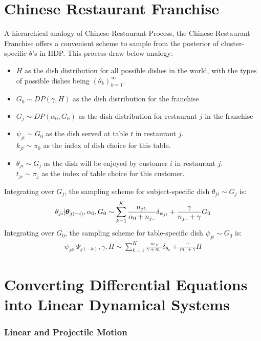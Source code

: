 \documentclass{article} %
\begin{document}
\section{Chinese Restaurant Franchise}\label{sec:CRF}
A hierarchical analogy of Chinese Restaurant Process, the Chinese Restaurant Franchise offers a convenient scheme to sample from the posterior of cluster-specific $\theta$'s in HDP. This process draw below analogy:
\begin{itemize}
\item $H$ as the dish distribution for all possible dishes in the world, with the types of possible dishes being $(\theta_k)_{k=1}^\infty$.
\item  $G_0 \sim DP(\gamma, H)$ as the dish distribution for the franchise
\item $G_j \sim DP(\alpha_0, G_0)$ as the dish distribution for restaurant $j$ in the franchise
\item $\psi_{jt} \sim G_0$ as the dish served at table $t$ in restaurant $j$.\\ $k_{jt} \sim \pi_0$ as the index of dish choice for this table.
\item $\theta_{ji} \sim G_j$ as the dish will be enjoyed by customer $i$ in restaurant $j$. \\
$t_{ji} \sim \pi_j$ as the index of table choice for this customer.
\end{itemize}
Integrating over $G_j$, the sampling scheme for subject-specific dish $\theta_{ji} \sim G_j$ is:
\begin{align*}
\theta_{ji} | \boldsymbol{\theta}_{j(-i)}, \alpha_0, G_0 \sim
\sum_{k=1}^K \frac{n_{jt.}}{\alpha_0 + n_{j..}} \delta_{\psi_{jt}} +
\frac{\gamma}{n_{j..} + \gamma} G_0
\end{align*}
Integrating over $G_0$, the sampling scheme for table-specific dish $\psi_{jt} \sim G_0$ is:
\begin{align*}
\psi_{jk} | \Psi_{j(-k)}, \gamma, H \sim
\sum_{k=1}^K \frac{m_{.k}}{\gamma + m_{..}} \delta_{\theta_{k}} +
\frac{\gamma}{m_{..} + \gamma} H
\end{align*}

\section{Converting Differential Equations into Linear Dynamical Systems} \label{sec:ode2lds}
\subsubsection{Linear and Projectile
Motion}
\end{document}
